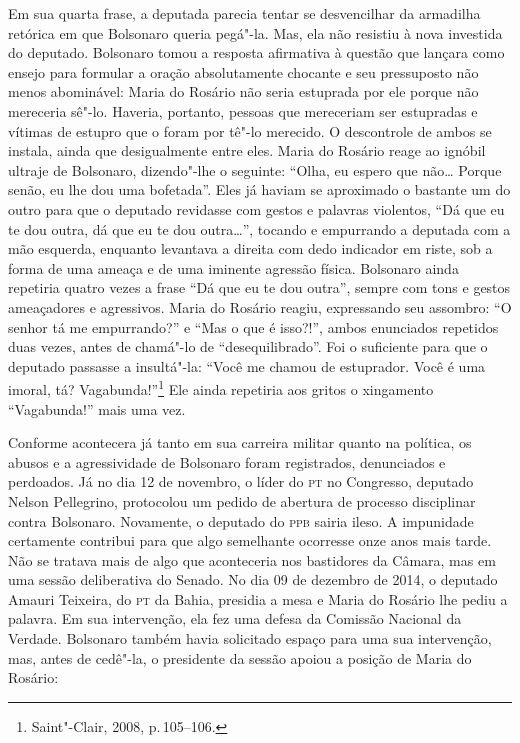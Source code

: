Em sua quarta frase, a deputada parecia tentar se desvencilhar da
armadilha retórica em que Bolsonaro queria pegá"-la. Mas, ela não
resistiu à nova investida do deputado. Bolsonaro tomou a resposta
afirmativa à questão que lançara como ensejo para formular a oração
absolutamente chocante e seu pressuposto não menos abominável: Maria do
Rosário não seria estuprada por ele porque não mereceria sê"-lo. Haveria,
portanto, pessoas que mereceriam ser estupradas e vítimas de estupro que
o foram por tê"-lo merecido. O descontrole de ambos se instala, ainda que
desigualmente entre eles. Maria do Rosário reage ao ignóbil ultraje de
Bolsonaro, dizendo"-lhe o seguinte: ``Olha, eu espero que não\ldots{} Porque
senão, eu lhe dou uma bofetada''. Eles já haviam se aproximado o
bastante um do outro para que o deputado revidasse com gestos e palavras
violentos, ``Dá que eu te dou outra, dá que eu te dou outra\ldots{}'',
tocando e empurrando a deputada com a mão esquerda, enquanto levantava a
direita com dedo indicador em riste, sob a forma de uma ameaça e de uma
iminente agressão física. Bolsonaro ainda repetiria quatro vezes a frase
``Dá que eu te dou outra'', sempre com tons e gestos ameaçadores e
agressivos. Maria do Rosário reagiu, expressando seu assombro: ``O
senhor tá me empurrando?'' e ``Mas o que é isso?!'', ambos enunciados
repetidos duas vezes, antes de chamá"-lo de ``desequilibrado''. Foi o
suficiente para que o deputado passasse a insultá"-la: ``Você me chamou
de estuprador. Você é uma imoral, tá? Vagabunda!''\footnote{Saint"-Clair,
  2008, p.\,105--106.} Ele ainda repetiria aos gritos o xingamento
``Vagabunda!'' mais uma vez.

Conforme acontecera já tanto em sua carreira militar quanto na política,
os abusos e a agressividade de Bolsonaro foram registrados, denunciados
e perdoados. Já no dia 12 de novembro, o líder do \textsc{pt} no Congresso,
deputado Nelson Pellegrino, protocolou um pedido de abertura de processo
disciplinar contra Bolsonaro. Novamente, o deputado do \textsc{ppb} sairia ileso.
A impunidade certamente contribui para que algo semelhante ocorresse
onze anos mais tarde. Não se tratava mais de algo que aconteceria nos
bastidores da Câmara, mas em uma sessão deliberativa do Senado. No dia
09 de dezembro de 2014, o deputado Amauri Teixeira, do \textsc{pt} da Bahia,
presidia a mesa e Maria do Rosário lhe pediu a palavra. Em sua
intervenção, ela fez uma defesa da Comissão Nacional da Verdade.
Bolsonaro também havia solicitado espaço para uma sua intervenção, mas,
antes de cedê"-la, o presidente da sessão apoiou a posição de Maria do
Rosário:


